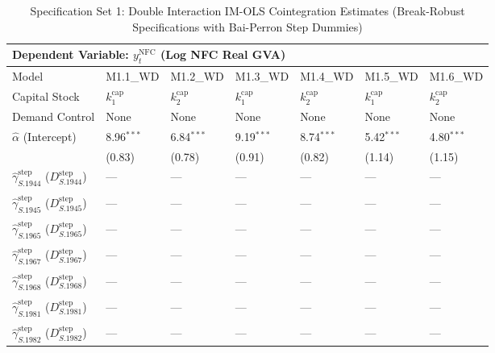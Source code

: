 \begin{table}[H]
\centering
\caption{Specification Set 1: Double Interaction IM-OLS Cointegration Estimates (Break-Robust Specifications with Bai-Perron Step Dummies)}
\label{tab:spec_set_1_wd}
\scriptsize
\begin{tabular}{p{3.8cm}p{1.35cm}p{1.35cm}p{1.35cm}p{1.35cm}p{1.35cm}p{1.35cm}}
\toprule
\multicolumn{7}{l}{\textbf{Dependent Variable: $y_t^{\text{NFC}}$ (Log NFC Real GVA)}} \\
\midrule
Model & M1.1\_WD & M1.2\_WD & M1.3\_WD & M1.4\_WD & M1.5\_WD & M1.6\_WD  \\
Capital Stock & $k^{\text{cap}}_1$ & $k^{\text{cap}}_2$ & $k^{\text{cap}}_1$ & $k^{\text{cap}}_2$ & $k^{\text{cap}}_1$ & $k^{\text{cap}}_2$  \\
Demand Control & None & None & None & None & None & None  \\
\midrule
$\hat{\alpha}$ (Intercept)  & 8.96$^{***}$ & 6.84$^{***}$ & 9.19$^{***}$ & 8.74$^{***}$ & 5.42$^{***}$ & 4.80$^{***}$  \\
 & {\scriptsize (0.83)} & {\scriptsize (0.78)} & {\scriptsize (0.91)} & {\scriptsize (0.82)} & {\scriptsize (1.14)} & {\scriptsize (1.15)}  \\
$\hat{\gamma}^{\text{step}}_{S.1944}$ ($D^{\text{step}}_{S.1944}$)  & --- & --- & --- & --- & --- & ---  \\
 &  &  &  &  &  &   \\
$\hat{\gamma}^{\text{step}}_{S.1945}$ ($D^{\text{step}}_{S.1945}$)  & --- & --- & --- & --- & --- & ---  \\
 &  &  &  &  &  &   \\
$\hat{\gamma}^{\text{step}}_{S.1965}$ ($D^{\text{step}}_{S.1965}$)  & --- & --- & --- & --- & --- & ---  \\
 &  &  &  &  &  &   \\
$\hat{\gamma}^{\text{step}}_{S.1967}$ ($D^{\text{step}}_{S.1967}$)  & --- & --- & --- & --- & --- & ---  \\
 &  &  &  &  &  &   \\
$\hat{\gamma}^{\text{step}}_{S.1968}$ ($D^{\text{step}}_{S.1968}$)  & --- & --- & --- & --- & --- & ---  \\
 &  &  &  &  &  &   \\
$\hat{\gamma}^{\text{step}}_{S.1981}$ ($D^{\text{step}}_{S.1981}$)  & --- & --- & --- & --- & --- & ---  \\
 &  &  &  &  &  &   \\
$\hat{\gamma}^{\text{step}}_{S.1982}$ ($D^{\text{step}}_{S.1982}$)  & --- & --- & --- & --- & --- & ---  \\

\end{tabular}
\end{table}
